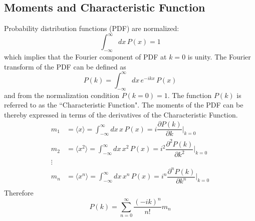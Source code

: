 \documentclass[aps,prb,onecolumn,notitlepage,showpacs,floatfix,superscriptaddress]{revtex4-1}
\begin{document}
\subsection*{Moments and Characteristic Function}
Probability distribution functions (PDF) are normalized:
\begin{equation}
\int_{-\infty}^{\infty} dx \, P(x) = 1
\end{equation}
which implies that the Fourier component of PDF at $k=0$ is unity. The Fourier transform of the PDF can be defined as
\begin{equation}
P(k) = \int_{-\infty}^{\infty} dx \, e^{-ikx} \, P(x) 
\end{equation} 
and from the normalization condition $P(k=0)=1$. The function $P(k)$ is referred to as the ``Characteristic Function". The moments of the PDF can be thereby expressed in terms of the derivatives of the Characteristic Function.
\begin{equation}
\begin{split}
m_1 &= \langle x \rangle = \int_{-\infty}^{\infty} dx \, x \, P(x) = i \dfrac{\partial P(k)}{\partial k} \bigg\vert_{k=0} \\
m_2 &= \langle x^2 \rangle = \int_{-\infty}^{\infty} dx \, x^2 \, P(x) = i^2 \dfrac{\partial^2 P(k)}{\partial k^2} \bigg\vert_{k=0} \\
\vdots \\
m_n &= \langle x^n \rangle = \int_{-\infty}^{\infty} dx \, x^n \, P(x) = i^n \dfrac{\partial^n P(k)}{\partial k^n} \bigg\vert_{k=0} \\
\end{split}
\end{equation}
Therefore
\begin{equation}
P(k) = \sum_{n=0}^{\infty} \dfrac{(-i k)^n}{n!} m_n
\end{equation}
\end{document}
